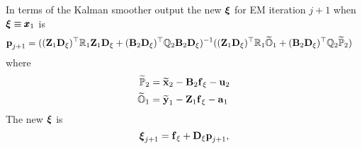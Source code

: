 \documentclass[]{article}
\def\xixi{\mbox{\boldmath $\xi$}}
\def\ZZ{\mbox{$\mathbf Z$}}	\def\zz{\mbox{$\mathbf z$}}
\def\BB{\mbox{$\mathbf B$}}	\def\bb{\mbox{$\mathbf b$}}
\def\DD{\mbox{$\mathbf D$}}	\def\dd{\mbox{$\mathbf d$}}
\begin{document}
In terms of the Kalman smoother output the new $\xixi$ for EM iteration $j+1$ when $\xixi \equiv \xx_1$ is
\begin{equation}\label{eq:pix1.unconstrained.V0.is.0.t.1.3}
\begin{split}
\pp_{j+1} &= ((\ZZ_1\DD_\xi)^\top\Rm_1\ZZ_1\DD_\xi + 
(\BB_2\DD_\xi)^\top\Qm_2\BB_2\DD_\xi)^{-1}
( (\ZZ_1\DD_\xi)^\top\Rm_1\widetilde{\mathbb{O}}_1 + (\BB_2\DD_\xi)^\top\Qm_2\widetilde{\mathbb{P}}_2)
\end{split}
\end{equation}
where
\begin{equation}
\begin{split}
\widetilde{\mathbb{P}}_2 &=\widetilde{\mbox{$\mathbf x$}}_2 - \BB_2\ff_\xi  - \uu_2\\
\widetilde{\mathbb{O}}_1 &=\widetilde{\mbox{$\mathbf y$}}_1 - \ZZ_1\ff_\xi  - \aa_1
\end{split}
\end{equation}
The new $\xixi$ is
\begin{equation}
\xixi_{j+1} = \ff_\xi + \DD_\xi\pp_{j+1},
\end{equation}
\end{document}
